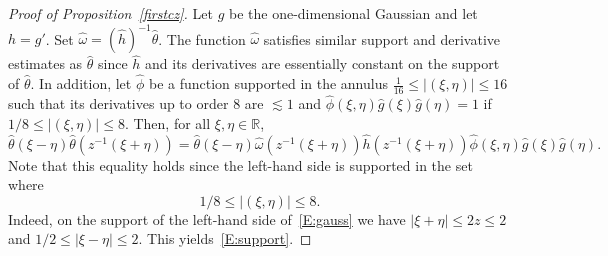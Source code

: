\documentclass[12pt,reqno]{amsart}
\theoremstyle{plain}
\theoremstyle{definition}
\numberwithin{equation}{section}
\newcommand{\R}{{\mathbb R}}
\def\wh{\widehat}
\begin{document}
\begin{proof}[Proof of Proposition~\ref{firstcz}]
Let $g$ be the one-dimensional Gaussian and let $h=g'$. Set $\wh{\omega}=(\wh{h})^{-1}\wh{\theta}$. The function $\wh{\omega}$ satisfies similar support and derivative estimates as $\wh{\theta}$ since $\wh{h}$ and its derivatives are essentially constant on the support of $\wh{\theta}$.
In addition, let $\wh{\phi}$ be a function
supported in the annulus $\frac{1}{16} \leq |(\xi,\eta)| \leq 16$
such that  its derivatives up to order $8$ are $\lesssim 1$ 
and  $\wh{\phi}(\xi,\eta) \wh{g}(\xi) \wh{g}(\eta)=1$ if $1/8 \leq |(\xi,\eta)| \leq 8$.
Then, for all $\xi,\eta\in \R$,
\begin{equation}\label{E:gauss}
\wh{\theta}(\xi-\eta) \wh{\theta}(z^{-1}(\xi+\eta))
=
\wh{\theta}(\xi-\eta)\wh{\omega} (z^{-1}(\xi+\eta))
 \wh{h}(z^{-1}(\xi+\eta))\wh{\phi}(\xi,\eta) \wh{g}(\xi) \wh{g}(\eta). 
\end{equation}
 Note that this equality holds since the left-hand side is supported in the set where 
 \begin{equation}\label{E:support}
 1/8 \leq  |(\xi,\eta)| \leq 8.
 \end{equation} 
 Indeed, on the support of the left-hand side of~\eqref{E:gauss} we have
 $|\xi+\eta| \leq 2z \leq 2$ and $1/2 \leq |\xi-\eta| \leq 2$.
This yields~\eqref{E:support}. 
 

\end{proof}
\end{document}
